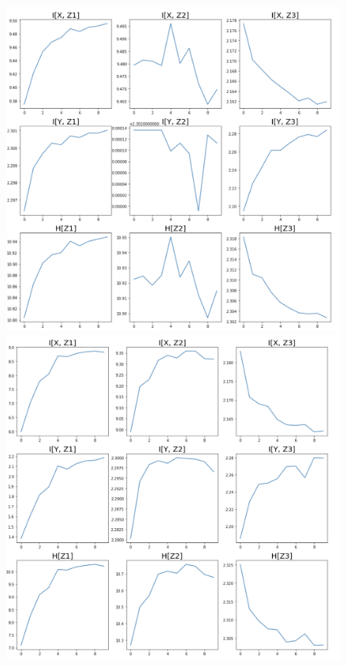 \begin{figure}[!htb]
  \includegraphics[width=\linewidth]{images/v2.png}
  
\endminipage\hfill
{}
  \includegraphics[width=\linewidth]{images/v3.png}
  

\end{figure}

